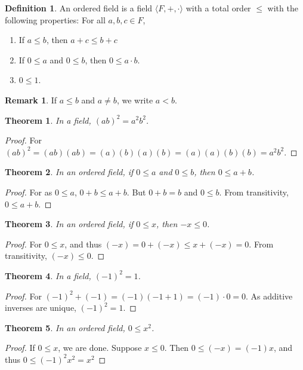 \documentclass[oneside]{book}
\newtheorem{theorem}{Theorem}[section]
\theoremstyle{definition}
\newtheorem{definition}{Definition}[section]
\newtheorem{remark}{Remark}[section]
\begin{document}
\begin{definition}
An ordered field is a field $\langle F,+,\cdot \rangle$ with a total order $\leq$ with the following properties: For all $a,b,c\in F$,
\begin{enumerate}
\item If $a\leq b$, then $a+c\leq b+c$
\item If $0 \leq a$ and $0\leq b$, then $0\leq a\cdot b$.
\item $0\leq 1$.
\end{enumerate}
\end{definition}

\begin{remark}
If $a\leq b$ and $a\ne b$, we write $a<b$.
\end{remark}

\begin{theorem}
In a field, $(ab)^2 = a^2b^2$.
\end{theorem}
\begin{proof}
For $(ab)^2 = (ab)(ab)=(a)(b)(a)(b)= (a)(a)(b)(b)=a^2b^2$.
\end{proof}

\begin{theorem} In an ordered field, if $0\leq a$ and $0\leq b$, then $0\leq a+b$.
\end{theorem}
\begin{proof}
For as $0\leq a$, $0+b\leq a+b$. But $0+b = b$ and $0\leq b$. From transitivity, $0\leq a+b$.
\end{proof}

\begin{theorem}
In an ordered field, if $0\leq x$, then $-x\leq 0$.
\end{theorem}
\begin{proof}
For $0\leq x$, and thus $(-x)=0+(-x)\leq x+(-x) =0$. From transitivity, $(-x)\leq 0$.
\end{proof}

\begin{theorem}
In a field, $(-1)^2 = 1$.
\end{theorem}
\begin{proof}
For $(-1)^2 +(-1) = (-1)(-1+1) = (-1)\cdot 0 = 0$. As additive inverses are unique, $(-1)^2 = 1$.
\end{proof}

\begin{theorem}
In an ordered field, $0\leq x^2$.
\end{theorem}
\begin{proof}
If $0 \leq x$, we are done. Suppose $x\leq 0$. Then $0\leq (-x) = (-1)x$, and thus $0\leq (-1)^2 x^2=x^2$
\end{proof}
\end{document}
